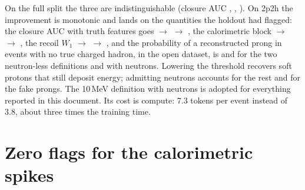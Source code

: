 \documentclass[11pt]{article}
\begin{document}
On the full split the three are indistinguishable (closure AUC \nVKEfiftyFullAUCmarg{}, \nVKEtenFullAUCmarg{},
\nVKEtennFullAUCmarg{}). On 2p2h the improvement is monotonic and lands on the quantities the holdout had flagged:
the closure AUC with truth features goes \nVKEfiftyTwoPAUCcond{} $\to$ \nVKEtenTwoPAUCcond{} $\to$
\nVKEtennTwoPAUCcond{}, the calorimetric block \nVKEfiftyTwoPCalo{} $\to$ \nVKEtenTwoPCalo{} $\to$
\nVKEtennTwoPCalo{}, the recoil $W_1$ \nVKEfiftyTwoPWoneRecoil{} $\to$ \nVKEtenTwoPWoneRecoil{} $\to$
\nVKEtennTwoPWoneRecoil{}, and the probability of a reconstructed prong in events with no true charged hadron,
\nVKEfiftyTwoPFakeReal{} in the open dataset, is \nVKEfiftyTwoPFakeSur{} and \nVKEtenTwoPFakeSur{} for the two
neutron-less definitions and \nVKEtennTwoPFakeSur{} with neutrons. Lowering the threshold recovers soft protons that
still deposit energy; admitting neutrons accounts for the rest and for the fake prongs. The 10\,MeV definition with
neutrons is adopted for everything reported in this document. Its cost is compute: 7.3 tokens per event instead of
3.8, about three times the training time.

\begin{table}[h]\centering\small
\resizebox{\textwidth}{!}{}
\caption{Input-definition variants on the full test split: 50\,MeV without neutrons (ke50), 10\,MeV without
neutrons (ke10), 10\,MeV with neutron tokens (ke10n).}
\label{tab:var-full}
\end{table}

\begin{table}[h]\centering\small
\resizebox{\textwidth}{!}{}
\caption{The same variants on the 2p2h test events.}
\label{tab:var-2p2h}
\end{table}

\section{Zero flags for the calorimetric spikes}
\label{sec:zero}
\end{document}
